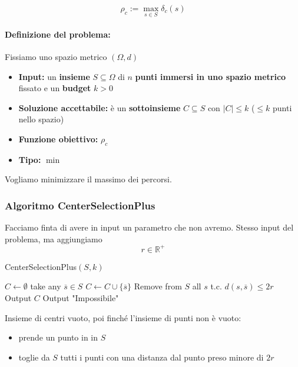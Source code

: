 $$ \rho_c := \max_{s \in S} \delta_c (s) $$

\newpage

\paragraph{Definizione del problema:} Fissiamo uno spazio metrico $(\Omega, d)$
\begin{itemize}
	\item \textbf{Input:} un \textbf{insieme} $S \subseteq \Omega$ di $n$ \textbf{punti immersi in uno spazio metrico} fissato e un \textbf{budget} $k>0$
	
	\item \textbf{Soluzione accettabile:} è un \textbf{sottoinsieme} $C \subseteq S$ con $|C| \leq k$ ($\leq k$ punti nello spazio)
	
	\item \textbf{Funzione obiettivo:} $\rho_c$
	
	\item \textbf{Tipo:} $\min$
\end{itemize}
Vogliamo minimizzare il massimo dei percorsi.\\

\subsubsection{Algoritmo CenterSelectionPlus} 
Facciamo finta di avere in input un parametro che non avremo. Stesso input del problema, ma aggiungiamo 
$$ r \in \mathbb{R}^+ $$

\begin{algorithm}
	\caption{CenterSelectionPlus$(S, k)$}
	\begin{algorithmic}
		\STATE $C \leftarrow \emptyset$
		\STATE take any $\overline{s} \in S$
		\STATE $C \leftarrow C \cup \{\overline{s}\}$
		\STATE Remove from $S$ all $s$ t.c. $d(s, \overline{s}) \leq 2r$
		\ENDWHILE
		\STATE Output $C$
		\ELSE
		\STATE Output "Impossibile"
		\ENDIF
	\end{algorithmic}
\end{algorithm}

Insieme di centri vuoto, poi finché l'insieme di punti non è vuoto: 
\begin{itemize}
	\item prende un punto in in $S$
	\item toglie da $S$ tutti i punti con una distanza dal punto preso minore di $2r$
\end{itemize}

